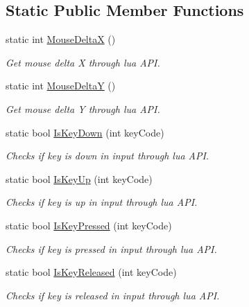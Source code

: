 \subsection*{Static Public Member Functions}
\begin{DoxyCompactItemize}
\item 
static int \hyperlink{class_input_manager_a_p_i_a958df6a0f9d242cbcab8f5e8451dcc52}{Mouse\+DeltaX} ()
\begin{DoxyCompactList}\small\item\em Get mouse delta X through lua A\+PI. \end{DoxyCompactList}\item 
static int \hyperlink{class_input_manager_a_p_i_a560f8c659b7b0b90e017e1ca415dcff7}{Mouse\+DeltaY} ()
\begin{DoxyCompactList}\small\item\em Get mouse delta Y through lua A\+PI. \end{DoxyCompactList}\item 
static bool \hyperlink{class_input_manager_a_p_i_aec8bc199cc78f455eb389a17354da2f3}{Is\+Key\+Down} (int key\+Code)
\begin{DoxyCompactList}\small\item\em Checks if key is down in input through lua A\+PI. \end{DoxyCompactList}\item 
static bool \hyperlink{class_input_manager_a_p_i_aebcfc59983f58615bcc0e4bb3540343a}{Is\+Key\+Up} (int key\+Code)
\begin{DoxyCompactList}\small\item\em Checks if key is up in input through lua A\+PI. \end{DoxyCompactList}\item 
static bool \hyperlink{class_input_manager_a_p_i_ae9d2da474cf31a7d36bbdc1b2e787e1d}{Is\+Key\+Pressed} (int key\+Code)
\begin{DoxyCompactList}\small\item\em Checks if key is pressed in input through lua A\+PI. \end{DoxyCompactList}\item 
static bool \hyperlink{class_input_manager_a_p_i_a43d36f6532fa59feecd8c8b720ed4d82}{Is\+Key\+Released} (int key\+Code)
\begin{DoxyCompactList}\small\item\em Checks if key is released in input through lua A\+PI. \end{DoxyCompactList}\item 

\end{DoxyCompactItemize}
